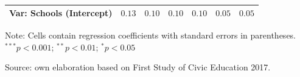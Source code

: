 \documentclass[
  12pt,
  letterpaper,
]{article}
\begin{document}
\begin{table}
{\begin{center}
{\begin{threeparttable}
\begin{tabular}{l c c c c c c}
Var: Schools (Intercept)                               & $0.13$        & $0.10$        & $0.10$        & $0.10$        & $0.05$        & $0.05$        \\
\bottomrule
\end{tabular}
\begin{tablenotes}[flushleft]
\scriptsize{\item Note: Cells contain regression coefficients with standard errors in parentheses. $^{***}p<0.001$; $^{**}p<0.01$; $^{*}p<0.05$ \\ \item Source: own elaboration based on First Study of Civic Education 2017.}
\end{tablenotes}
\end{threeparttable}
}
\caption{}
\label{table:coefficients}
\end{center}

}

\end{table}%
\end{document}

